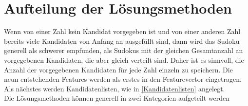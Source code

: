 \section{Aufteilung der Lösungsmethoden}
Wenn von einer Zahl kein Kandidat vorgegeben ist und von einer anderen Zahl bereits viele Kandidaten von Anfang an ausgefüllt sind, dann wird das Sudoku generell als schwerer empfunden, als Sudokus mit der gleichen Gesamtanzahl an vorgegebenen Kandidaten, die aber gleich verteilt sind. Daher ist es sinnvoll, die Anzahl der vorgegebenen Kandidaten für jede Zahl einzeln zu speichern. Die neun entstehenden Features werden als erstes in den Featurevector eingetragen.\\
Als nächstes werden Kandidatenlisten, wie in \ref{Kandidatenlisten} angelegt.\\
Die Lösungsmethoden können generell in zwei Kategorien aufgeteilt werden